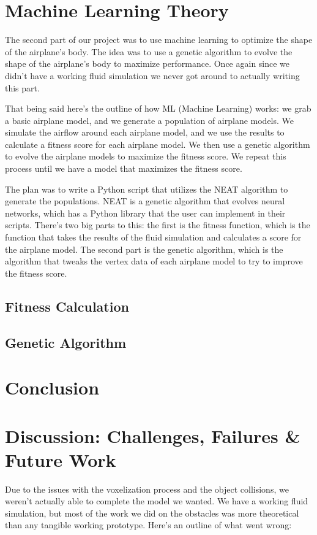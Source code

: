 \documentclass[a4paper,12pt,titlepage]{article}
\begin{document}
\section{Machine Learning Theory}
The second part of our project was to use machine learning to optimize the shape
of the airplane's body. The idea was to use a genetic algorithm to evolve the
shape of the airplane's body to maximize performance. Once again since we didn't
have a working fluid simulation we never got around to actually writing this part.

That being said here's the outline of how ML (Machine Learning) works: we grab
a basic airplane model, and we generate a population of airplane models. We
simulate the airflow around each airplane model, and we use the results to calculate
a fitness score for each airplane model. We then use a genetic algorithm to evolve
the airplane models to maximize the fitness score. We repeat this process until
we have a model that maximizes the fitness score.

The plan was to write a Python script that utilizes the NEAT algorithm to generate
the populations. NEAT is a genetic algorithm that evolves neural networks, which
has a Python library that the user can implement in their scripts.
There's two big parts to this: the first is the fitness function, which is the
function that takes the results of the fluid simulation and calculates a score
for the airplane model. The second part is the genetic algorithm, which is the
algorithm that tweaks the vertex data of each airplane model to try to improve
the fitness score.

\subsection{Fitness Calculation}
\subsection{Genetic Algorithm}

\pagebreak
\section{Conclusion}
\ipsum[1]

\pagebreak
\section{Discussion: Challenges, Failures \& Future Work}
Due to the issues with the voxelization process and the object collisions, we
weren't actually able to complete the model we wanted. We have a working fluid
simulation, but most of the work we did on the obstacles was more theoretical
than any tangible working prototype. Here's an outline of what went wrong:
\end{document}
